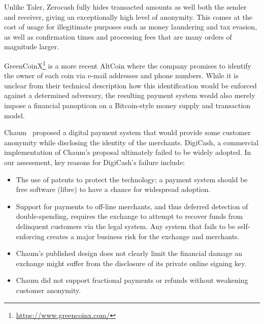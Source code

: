\documentclass[sigconf, authordraft]{acmart}
\begin{document}
Unlike Taler, Zerocash fully hides transacted amounts as well both the sender
and receiver, giving an exceptionally  high level of anonymity.  This comes at
the cost of usage for illegitimate purposes such as money laundering and tax
evasion, as well as confirmation times and processing fees that are many orders
of magnitude larger.

GreenCoinX\footnote{\url{https://www.greencoinx.com/}} is a more
recent AltCoin where the company promises to identify the owner of
each coin via e-mail addresses and phone numbers.  While it is unclear
from their technical description how this identification would be
enforced against a determined adversary, the resulting payment system
would also merely impose a financial panopticon on a Bitcoin-style
money supply and transaction model.


Chaum~\cite{chaum1983blind} proposed a digital payment system that
would provide some customer anonymity while disclosing the identity of
the merchants.  DigiCash, a commercial implementation of Chaum's
proposal ultimately failed to be widely adopted.  In our assessment,
key reasons for DigiCash's failure include:

\begin{itemize}
 \item The use of patents to protect the technology; a payment system
   should be free software (libre) to have a chance for widespread adoption.
 \item Support for payments to off-line merchants, and thus deferred
   detection of double-spending, requires the exchange to attempt to
   recover funds from delinquent customers via the legal system.
   Any system that fails to be self-enforcing creates a major
   business risk for the exchange and merchants.
 \item %
   Chaum's published design does not clearly
   limit the financial damage an exchange might suffer from the
   disclosure of its private online signing key.
 \item Chaum did not support fractional payments or refunds without
   weakening customer anonymity.
\end{itemize}
\end{document}
